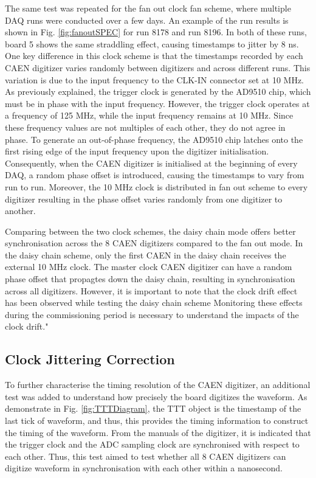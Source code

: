 The same test was repeated for the fan out clock fan scheme, where multiple DAQ runs were conducted over a few days.
An example of the run results is shown in Fig. \ref{fig:fanoutSPEC} for run 8178 and run 8196.
In both of these runs, board 5 shows the same straddling effect, causing timestamps to jitter by 8 ns.
One key difference in this clock scheme is that the timestamps recorded by each CAEN digitizer varies randomly between digitizers and across different runs. 
This variation is due to the input frequency to the CLK-IN connector set at 10 MHz.
As previously explained, the trigger clock is generated by the AD9510 chip, which must be in phase with the input frequency. 
However, the trigger clock operates at a frequency of 125 MHz, while the input frequency remains at 10 MHz. 
Since these frequency values are not multiples of each other, they do not agree in phase.
To generate an out-of-phase frequency, the AD9510 chip latches onto the first rising edge of the input frequency upon the digitizer initialisation. 
Consequently, when the CAEN digitizer is initialised at the beginning of every DAQ, a random phase offset is introduced, causing the timestamps to vary from run to run.
Moreover, the 10 MHz clock is distributed in fan out scheme to every digitizer resulting in the phase offset varies randomly from one digitizer to another.

Comparing between the two clock schemes, the daisy chain mode offers better synchronisation across the 8 CAEN digitizers compared to the fan out mode.
In the daisy chain scheme, only the first CAEN in the daisy chain receives the external 10 MHz clock.
The master clock CAEN digitizer can have a random phase offset that propagtes down the daisy chain, resulting in synchronisation across all digitizers.
However, it is important to note that the clock drift effect has been observed while testing the daisy chain scheme
Monitoring these effects during the commissioning period is necessary to understand the impacts of the clock drift."

\subsection{Clock Jittering Correction}

To further characterise the timing resolution of the CAEN digitizer, an additional test was added to understand how precisely the board digitizes the waveform.
As demonstrate in Fig. \ref{fig:TTTDiagram}, the TTT object is the timestamp of the last tick of waveform, and thus, this provides the timing information to construct the timing of the waveform.
From the manuals of the digitizer, it is indicated that the trigger clock and the ADC sampling clock are synchronised with respect to each other.
Thus, this test aimed to test whether all 8 CAEN digitizers can digitize waveform in synchronisation with each other within a nanosecond. 

